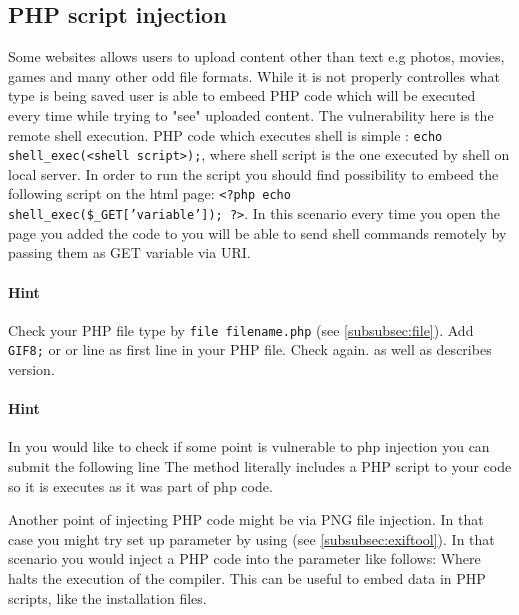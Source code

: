 \subsection{PHP script injection}
\label{subsec:phpinjection}
Some websites allows users to upload content other than text e.g photos, movies, games and many other odd file formats.
While it is not properly controlles what type is being saved user is able to embeed PHP code which will be executed every time while trying to "see" uploaded content.
The vulnerability here is the remote shell execution.
PHP code which executes shell is simple : \texttt{echo shell\_exec(<shell script>);}, where shell script is the one executed by shell on local server.
In order to run the script you should find possibility to embeed the following script on the html page: \texttt{<?php echo shell\_exec(\$\_GET['variable']); ?>}.
In this scenario every time you open the page you added  the code to
you will be able to send shell commands remotely by passing them as GET variable via URI.

\paragraph{Hint} Check your PHP file type by \texttt{file filename.php} (see \ref{subsubsec:file}).
Add \texttt{GIF8;} or  or  line as first line in your PHP file.
Check again.
 as well as  describes version.

\paragraph{Hint} In you would like to check if some point is vulnerable to php injection you can submit the following line 
The  method literally includes a PHP script to your code so it is executes as it was part of php code.

Another point of injecting PHP code might be via PNG file injection.
In that case you might try set up  parameter by using  (see \ref{subsubsec:exiftool}).
In that scenario you would inject a PHP code into the parameter like follows:  \newline
{} \newline
Where  halts the execution of the compiler.
This can be useful to embed data in PHP scripts, like the installation files.


